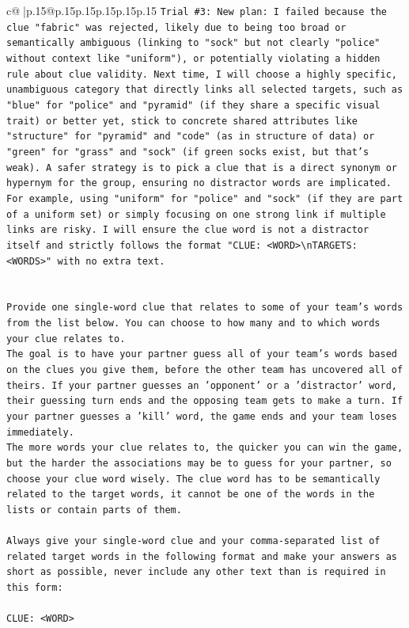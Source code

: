 \documentclass{article}
\begin{document}
{\begin{supertabular}{c@{$\;$}|p{.15\linewidth}@{}p{.15\linewidth}p{.15\linewidth}p{.15\linewidth}p{.15\linewidth}p{.15\linewidth}}
{{{\texttt{Trial \#3: New plan: I failed because the clue "fabric" was rejected, likely due to being too broad or semantically ambiguous (linking to "sock" but not clearly "police" without context like "uniform"), or potentially violating a hidden rule about clue validity. Next time, I will choose a highly specific, unambiguous category that directly links all selected targets, such as "blue" for "police" and "pyramid" (if they share a specific visual trait) or better yet, stick to concrete shared attributes like "structure" for "pyramid" and "code" (as in structure of data) or "green" for "grass" and "sock" (if green socks exist, but that's weak). A safer strategy is to pick a clue that is a direct synonym or hypernym for the group, ensuring no distractor words are implicated. For example, using "uniform" for "police" and "sock" (if they are part of a uniform set) or simply focusing on one strong link if multiple links are risky. I will ensure the clue word is not a distractor itself and strictly follows the format "CLUE: <WORD>\textbackslash{}nTARGETS: <WORDS>" with no extra text.} \\
\\ 
\\ 
\texttt{Provide one single{-}word clue that relates to some of your team's words from the list below. You can choose to how many and to which words your clue relates to.} \\
\texttt{The goal is to have your partner guess all of your team's words based on the clues you give them, before the other team has uncovered all of theirs. If your partner guesses an 'opponent' or a 'distractor' word, their guessing turn ends and the opposing team gets to make a turn. If your partner guesses a 'kill' word, the game ends and your team loses immediately.} \\
\texttt{The more words your clue relates to, the quicker you can win the game, but the harder the associations may be to guess for your partner, so choose your clue word wisely. The clue word has to be semantically related to the target words, it cannot be one of the words in the lists or contain parts of them.} \\
\\ 
\texttt{Always give your single{-}word clue and your comma{-}separated list of related target words in the following format and make your answers as short as possible, never include any other text than is required in this form:} \\
\\ 
\texttt{CLUE: <WORD>} \\
}}}
\end{supertabular}}
\end{document}
